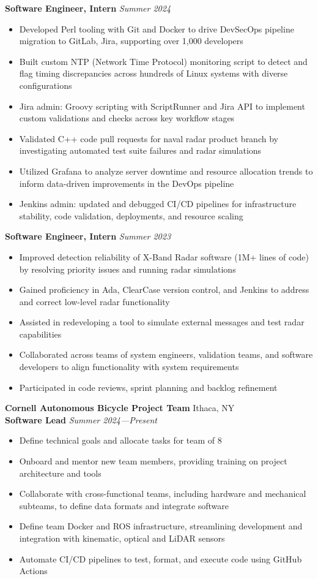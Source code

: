 \documentclass[letterpaper,10pt]{article}
\newcommand{\company}[2]{
    \vspace{6pt}
    {\large \textbf{#1}}
    \hfill
    {\normalsize {#2}}
    \\
}
\newcommand{\position}[2]{
    \vspace{4pt}
    {\normalsize \textbf {#1}}
    \hfill
    {\normalsize \textit{#2}}
    \\
}
\newcommand{\itemsBegin}{
    \begin{itemize}[leftmargin=0.2in, labelsep=0.05in, itemsep=0pt, parsep=1pt, topsep=0pt, partopsep=0pt]
}
\newcommand{\itemsEnd}{\end{itemize}}
\begin{document}
    \position{Software Engineer, Intern}{Summer 2024}
    \itemsBegin{}
        \item Developed Perl tooling with Git and Docker to drive DevSecOps pipeline migration to GitLab, Jira, supporting over 1,000 developers
        \item Built custom NTP (Network Time Protocol) monitoring script to detect and flag timing discrepancies across hundreds of Linux systems with diverse configurations
        \item Jira admin: Groovy scripting with ScriptRunner and Jira API to implement custom validations and checks across key workflow stages
        \item Validated C++ code pull requests for naval radar product branch by investigating automated test suite failures and radar simulations
        \item Utilized Grafana to analyze server downtime and resource allocation trends to inform data-driven improvements in the DevOps pipeline
        \item Jenkins admin: updated and debugged CI/CD pipelines for infrastructure stability, code validation, deployments, and resource scaling
    \itemsEnd{}

    \position{Software Engineer, Intern}{Summer 2023}
    \itemsBegin{}
        \item Improved detection reliability of X-Band Radar software (1M+ lines of code) by resolving priority issues and running radar simulations
        \item Gained proficiency in Ada, ClearCase version control, and Jenkins to address and correct low-level radar functionality
        \item Assisted in redeveloping a tool to simulate external messages and test radar capabilities
        \item Collaborated across teams of system engineers, validation teams, and software developers to align functionality with system requirements
        \item Participated in code reviews, sprint planning and backlog refinement
    \itemsEnd{}

    \company{Cornell Autonomous Bicycle Project Team}{Ithaca, NY}

    \position{Software Lead}{Summer 2024---Present}
    \itemsBegin{}
        \item Define technical goals and allocate tasks for team of 8
        \item Onboard and mentor new team members, providing training on project architecture and tools
        \item Collaborate with cross-functional teams, including hardware and mechanical subteams, to define data formats and integrate software
        \item Define team Docker and ROS infrastructure, streamlining development and integration with kinematic, optical and LiDAR sensors
        \item Automate CI/CD pipelines to test, format, and execute code using GitHub Actions
    \itemsEnd{}
\end{document}
